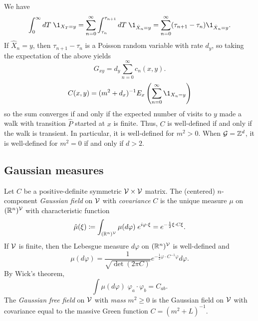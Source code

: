 \begin{example}
We have
\begin{equation}
\int_0^\infty dT \; \1_{X_T=y}
  =
\sum_{n=0}^\infty \int_{\tau_n}^{\tau_{n+1}} dT \; \1_{\hat X_n=y}
  =
\sum_{n=0}^\infty (\tau_{n+1} - \tau_n) \1_{\hat X_n=y}.
\end{equation}
If $\hat X_n = y$, then $\tau_{n+1} - \tau_n$ is a Poisson random variable with rate $d_y$,
so taking the expectation of the above yields
\begin{equation}
G_{xy} = d_y \sum_{n=0}^\infty c_n(x, y).
\end{equation}
\begin{equation}
C(x, y) = (m^2 + d_x)^{-1} E_x \left(\sum_{n=0}^\infty \1_{X_n=y} \right)
\end{equation}
so the sum converges if and only if the expected number of visits to $y$
made a walk with transition $\hat P$ started at $x$ is finite. Thus, $C$ is
well-defined if and only if the walk is transient.
In particular, it is well-defined for $m^2 > 0$. When $\mathcal{G} = { {{\mathbb Z}}^d }$, it is
well-defined for $m^2 = 0$ if and only if $d > 2$.
\end{example}

\begin{example}
\end{example}


\subsection{Gaussian measures}

Let $C$ be a positive-definite symmetric $\mathcal{V}\times\mathcal{V}$ matrix.
The (centered) $n$-component \emph{Gaussian field} on $\mathcal{V}$ with
\emph{covariance} $C$ is the unique measure $\mu$ on $({\mathbb R}^n)^{\mathcal{V}}$ with
characteristic function
\begin{equation}
\hat\mu(\xi)
  \coloneqq
\int_{({\mathbb R}^n)^{\mathcal{V}}} \mu(d\varphi) \; e^{i \varphi \cdot \xi}
  =
e^{-\frac{1}{2} \xi \cdot C \xi}.
\end{equation}
If $\mathcal{V}$ is finite, then the Lebesgue measure $d\varphi$ on $({\mathbb R}^n)^{\mathcal{V}}$
is well-defined and
\begin{equation}
\mu(d\varphi)
  =
\frac{1}{\sqrt{\det(2\pi C)}} e^{-\frac{1}{2} \varphi\cdot C^{-1}\varphi}
d\varphi.
\end{equation}
By Wick's theorem,
\begin{equation}
\int \mu(d\varphi) \; \varphi_a \cdot \varphi_b = C_{ab}.
\end{equation}
The \emph{Gaussian free field} on $\mathcal{V}$ with \emph{mass} $m^2 \ge 0$ is
the Gaussian field on $\mathcal{V}$ with covariance equal to the massive Green
function $C = (m^2 + L)^{-1}$.

